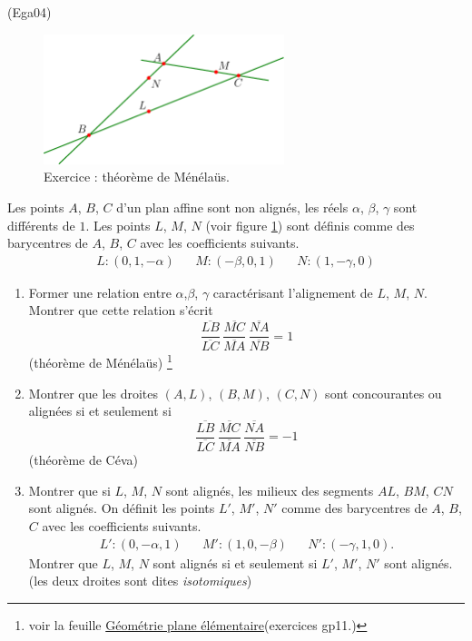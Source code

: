 \begin{tiny}(Ega04)\end{tiny}
\begin{figure}[h!]
  \centering
  \includegraphics[width=7cm]{Ega04_1.pdf}
  \caption{Exercice : théorème de Ménéla{\"u}s.}
  \label{fig:Ega04_1}
\end{figure}

Les points $A$, $B$, $C$ d'un plan affine sont non alignés, les réels $\alpha$, $\beta$, $\gamma$ sont différents de $1$. Les points $L$, $M$, $N$ (voir figure \ref{fig:Ega04_1}) sont définis comme des barycentres de $A$, $B$, $C$ avec les coefficients suivants.
\begin{align*}
 L:(0,1,-\alpha) & & M:(-\beta, 0, 1) & & N:(1,-\gamma, 0)
\end{align*}
\begin{enumerate}
 \item Former une relation entre $\alpha$,$\beta$, $\gamma$ caractérisant l'alignement de $L$, $M$, $N$. Montrer que cette relation s'écrit
\begin{displaymath}
\frac{\overline{LB}}{\overline{LC}}\,
\frac{\overline{MC}}{\overline{MA}}\,
\frac{\overline{NA}}{\overline{NB}}=1 
\end{displaymath}
(théorème de Ménélaüs)
\footnote{voir la feuille \href{http://back.maquisdoc.net/data/temptex/fexgp.pdf}{Géométrie plane élémentaire}(exercices gp11.)}
\item Montrer que les droites $(A,L)$, $(B,M)$, $(C,N)$ sont concourantes ou alignées si et seulement si 
\begin{displaymath}
\frac{\overline{LB}}{\overline{LC}}\,
\frac{\overline{MC}}{\overline{MA}}\,
\frac{\overline{NA}}{\overline{NB}}=-1 
\end{displaymath}
(théorème de Céva)
\item Montrer que si $L$, $M$, $N$ sont alignés, les milieux des segments $AL$, $BM$, $CN$ sont alignés.\newline
On définit les points $L'$, $M'$, $N'$ comme des barycentres de $A$, $B$, $C$ avec les coefficients suivants.
\begin{align*}
 L':(0,-\alpha,1) & & M':(1, 0, -\beta) & & N':(-\gamma, 1, 0).
\end{align*}
Montrer que $L$, $M$, $N$ sont alignés si et seulement si $L'$, $M'$, $N'$ sont alignés. (les deux droites sont dites \emph{isotomiques})
\end{enumerate}
